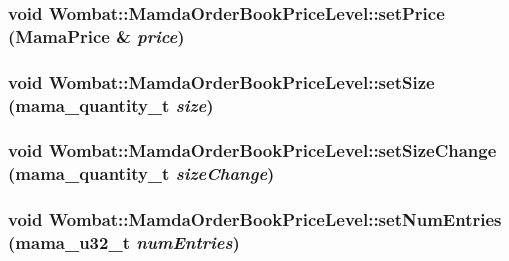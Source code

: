 \hypertarget{classWombat_1_1MamdaOrderBookPriceLevel_53777c749324feae82c96012e2c96045}{
\subsubsection[setPrice]{\setlength{\rightskip}{0pt plus 5cm}void Wombat::Mamda\-Order\-Book\-Price\-Level::set\-Price (Mama\-Price \& {\em price})}}
\label{classWombat_1_1MamdaOrderBookPriceLevel_53777c749324feae82c96012e2c96045}


\hypertarget{classWombat_1_1MamdaOrderBookPriceLevel_d97fa63c125f38871bc654c4539d7b91}{
\subsubsection[setSize]{\setlength{\rightskip}{0pt plus 5cm}void Wombat::Mamda\-Order\-Book\-Price\-Level::set\-Size (mama\_\-quantity\_\-t {\em size})}}
\label{classWombat_1_1MamdaOrderBookPriceLevel_d97fa63c125f38871bc654c4539d7b91}


\hypertarget{classWombat_1_1MamdaOrderBookPriceLevel_fa6a888a7989c844a67e4f9a7d60da4c}{
\subsubsection[setSizeChange]{\setlength{\rightskip}{0pt plus 5cm}void Wombat::Mamda\-Order\-Book\-Price\-Level::set\-Size\-Change (mama\_\-quantity\_\-t {\em size\-Change})}}
\label{classWombat_1_1MamdaOrderBookPriceLevel_fa6a888a7989c844a67e4f9a7d60da4c}


\hypertarget{classWombat_1_1MamdaOrderBookPriceLevel_7e6d1e53cd7f5ec1d8359d0760ddd09b}{
\subsubsection[setNumEntries]{\setlength{\rightskip}{0pt plus 5cm}void Wombat::Mamda\-Order\-Book\-Price\-Level::set\-Num\-Entries (mama\_\-u32\_\-t {\em num\-Entries})}}
\label{classWombat_1_1MamdaOrderBookPriceLevel_7e6d1e53cd7f5ec1d8359d0760ddd09b}


